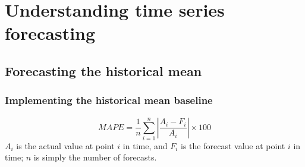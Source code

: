 \chapter{Understanding time series forecasting\label{ch01}}
\section{Forecasting the historical mean}
\subsection{Implementing the historical mean baseline}
\begin{equation}
    MAPE=\frac{1}{n}\sum_{i=1}^{n}\left|\frac{A_i-F_i}{A_i}\right|\times 100
\end{equation}
$A_i$ is the actual value at point $i$ in time, and $F_i$ is the forecast value at point $i$ in time; $n$ is simply the number of forecasts.

